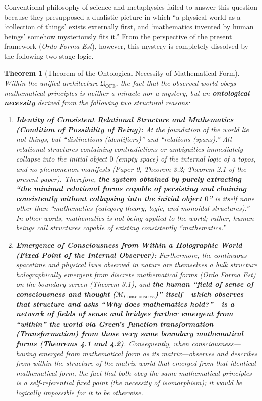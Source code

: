 \documentclass[11pt,a4paper]{article}
\theoremstyle{definition}
\theoremstyle{plain}
\newtheorem{theorem}{Theorem}[section]
\begin{document}
Conventional philosophy of science and metaphysics failed to answer this question because they presupposed a dualistic picture in which ``a physical world as a `collection of things' exists externally first, and `mathematics invented by human beings' somehow mysteriously fits it.'' From the perspective of the present framework (\textit{Ordo Forma Est}), however, this mystery is completely dissolved by the following two-stage logic.

\begin{theorem}[Theorem of the Ontological Necessity of Mathematical Form]
Within the unified architecture $\mathfrak{U}_{\mathrm{OFE}}$, the fact that the observed world obeys mathematical principles is neither a miracle nor a mystery, but an \textbf{ontological necessity} derived from the following two structural reasons:
\begin{enumerate}
    \item \textbf{Identity of Consistent Relational Structure and Mathematics (Condition of Possibility of Being):}
    At the foundation of the world lie not things, but ``distinctions (identifiers)'' and ``relations (spans).'' All relational structures containing contradictions or ambiguities immediately collapse into the initial object $0$ (empty space) of the internal logic of a topos, and no phenomenon manifests (Paper 0, Theorem 3.2; Theorem 2.1 of the present paper). Therefore, \textbf{the system obtained by purely extracting ``the minimal relational forms capable of persisting and chaining consistently without collapsing into the initial object $0$''} is itself none other than ``mathematics (category theory, logic, and monoidal structures).'' In other words, mathematics is not being applied to the world; rather, human beings call structures capable of existing consistently ``mathematics.''
    \item \textbf{Emergence of Consciousness from Within a Holographic World (Fixed Point of the Internal Observer):}
    Furthermore, the continuous spacetime and physical laws observed in nature are themselves a bulk structure holographically emergent from discrete mathematical forms (\textit{Ordo Forma Est}) on the boundary screen (Theorem 3.1), and \textbf{the human ``field of sense of consciousness and thought ($\mathcal{M}_{\mathrm{Consciousness}}$)'' itself---which observes that structure and asks ``Why does mathematics hold?''---is a network of fields of sense and bridges further emergent from ``within'' the world via Green's function transformation (Transformation) from those very same boundary mathematical forms (Theorems 4.1 and 4.2)}. Consequently, when consciousness---having emerged from mathematical form as its matrix---observes and describes from within the structure of the matrix world that emerged from that identical mathematical form, the fact that both obey the same mathematical principles is a self-referential fixed point (the necessity of isomorphism); it would be logically impossible for it to be otherwise.
\end{enumerate}
\end{theorem}
\end{document}
